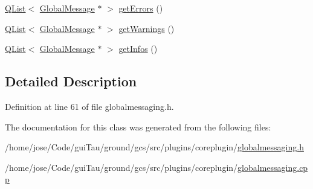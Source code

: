 \begin{DoxyCompactItemize}
\item 
\hyperlink{class_q_list}{Q\-List}$<$ \hyperlink{class_core_1_1_global_message}{Global\-Message} $\ast$ $>$ \hyperlink{group___core_plugin_gae1fc9548dca8947796b625256b217cf6}{get\-Errors} ()
\item 
\hyperlink{class_q_list}{Q\-List}$<$ \hyperlink{class_core_1_1_global_message}{Global\-Message} $\ast$ $>$ \hyperlink{group___core_plugin_ga0ed7555de2d566e21edbb19af678a83e}{get\-Warnings} ()
\item 
\hyperlink{class_q_list}{Q\-List}$<$ \hyperlink{class_core_1_1_global_message}{Global\-Message} $\ast$ $>$ \hyperlink{group___core_plugin_ga80c83327d603cfb00595f59c7503c3d1}{get\-Infos} ()
\end{DoxyCompactItemize}


\subsection{Detailed Description}


Definition at line 61 of file globalmessaging.\-h.



The documentation for this class was generated from the following files\-:\begin{DoxyCompactItemize}
\item 
/home/jose/\-Code/gui\-Tau/ground/gcs/src/plugins/coreplugin/\hyperlink{globalmessaging_8h}{globalmessaging.\-h}\item 
/home/jose/\-Code/gui\-Tau/ground/gcs/src/plugins/coreplugin/\hyperlink{globalmessaging_8cpp}{globalmessaging.\-cpp}\end{DoxyCompactItemize}
